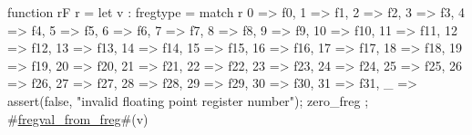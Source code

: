 function rF r = {
  let v : fregtype =
    match r {
      0 => f0,
      1 => f1,
      2 => f2,
      3 => f3,
      4 => f4,
      5 => f5,
      6 => f6,
      7 => f7,
      8 => f8,
      9 => f9,
      10 => f10,
      11 => f11,
      12 => f12,
      13 => f13,
      14 => f14,
      15 => f15,
      16 => f16,
      17 => f17,
      18 => f18,
      19 => f19,
      20 => f20,
      21 => f21,
      22 => f22,
      23 => f23,
      24 => f24,
      25 => f25,
      26 => f26,
      27 => f27,
      28 => f28,
      29 => f29,
      30 => f30,
      31 => f31,
      _  => {assert(false, "invalid floating point register number"); zero_freg}
    };
  #\hyperref[sailRISCVzfregvalzyfromzyfreg]{fregval\_from\_freg}#(v)
}
